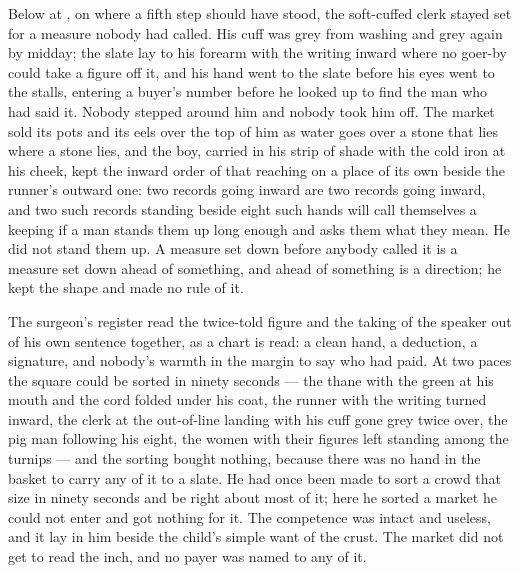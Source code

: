 Below  at , on  where a fifth step should have stood, the soft-cuffed clerk stayed set for a measure nobody had called. His cuff was grey from washing and grey again by midday; the slate lay to his forearm with the writing inward where no goer-by could take a figure off it, and his hand went to the slate before his eyes went to the stalls, entering a buyer's number before he looked up to find the man who had said it. Nobody stepped around him and nobody took him off. The market sold its pots and its eels over the top of him as water goes over a stone that lies where a stone lies, and the boy, carried in his strip of shade with the cold iron at his cheek, kept the inward order of that reaching on a place of its own beside the runner's outward one: two records going inward are two records going inward, and two such records standing beside eight such hands will call themselves a keeping if a man stands them up long enough and asks them what they mean. He did not stand them up. A measure set down before anybody called it is a measure set down ahead of something, and ahead of something is a direction; he kept the shape and made no rule of it.

The surgeon's register read the twice-told figure and the taking of the speaker out of his own sentence together, as a chart is read: a clean hand, a deduction, a signature, and nobody's warmth in the margin to say who had paid. At two paces the square could be sorted in ninety seconds --- the thane with the green at his mouth and the cord folded under his coat, the runner with the writing turned inward, the clerk at the out-of-line landing with his cuff gone grey twice over, the pig man following his eight, the women with their figures left standing among the turnips --- and the sorting bought nothing, because there was no hand in the basket to carry any of it to a slate. He had once been made to sort a crowd that size in ninety seconds and be right about most of it; here he sorted a market he could not enter and got nothing for it. The competence was intact and useless, and it lay in him beside the child's simple want of the crust. The market did not get to read the inch, and no payer was named to any of it.

